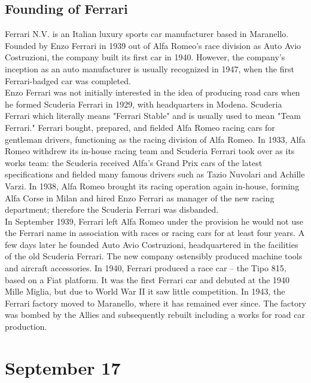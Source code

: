 \documentclass[11pt]{report}
\begin{document}
\subsection{Founding of Ferrari}
Ferrari N.V. is an Italian luxury sports car manufacturer based in Maranello. Founded by Enzo Ferrari in 1939 out of Alfa Romeo's race division as Auto Avio Costruzioni, the company built its first car in 1940. However, the company's inception as an auto manufacturer is usually recognized in 1947, when the first Ferrari-badged car was completed.\\ \indent Enzo Ferrari was not initially interested in the idea of producing road cars when he formed Scuderia Ferrari in 1929, with headquarters in Modena. Scuderia Ferrari which literally means "Ferrari Stable" and is usually used to mean "Team Ferrari." Ferrari bought, prepared, and fielded Alfa Romeo racing cars for gentleman drivers, functioning as the racing division of Alfa Romeo. In 1933, Alfa Romeo withdrew its in-house racing team and Scuderia Ferrari took over as its works team: the Scuderia received Alfa's Grand Prix cars of the latest specifications and fielded many famous drivers such as Tazio Nuvolari and Achille Varzi. In 1938, Alfa Romeo brought its racing operation again in-house, forming Alfa Corse in Milan and hired Enzo Ferrari as manager of the new racing department; therefore the Scuderia Ferrari was disbanded.\\
\indent In September 1939, Ferrari left Alfa Romeo under the provision he would not use the Ferrari name in association with races or racing cars for at least four years. A few days later he founded Auto Avio Costruzioni, headquartered in the facilities of the old Scuderia Ferrari. The new company ostensibly produced machine tools and aircraft accessories. In 1940, Ferrari produced a race car – the Tipo 815, based on a Fiat platform. It was the first Ferrari car and debuted at the 1940 Mille Miglia, but due to World War II it saw little competition. In 1943, the Ferrari factory moved to Maranello, where it has remained ever since. The factory was bombed by the Allies and subsequently rebuilt including a works for road car production.
\section{September 17}
\end{document}
